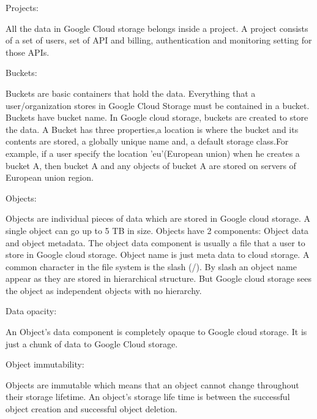 \documentclass[9pt,twocolumn,twoside]{../../styles/osajnl}
\begin{document}
\begin{flushleft}

Projects: 

All the data in Google Cloud storage belongs inside a project. A project consists of	 a set of users, set of API and billing, authentication and monitoring setting for those APIs.\cite{www-google-cloud-storage} 
\end{flushleft}


\begin{flushleft}
Buckets:

Buckets are basic containers that hold the data. Everything that a user/organization stores in Google Cloud Storage must be contained in a bucket. Buckets have bucket name. In Google cloud storage, buckets are created to store the data. A Bucket has three properties,a location is where the bucket and its contents are stored, a globally unique name and, a default storage class.For example, if a user specify the location 'eu'(European union)  when he creates a bucket A, then bucket A and any objects of bucket A are stored on servers of European union region. 

\end{flushleft}


\begin{flushleft}

Objects:

Objects are individual pieces of data which are stored in Google cloud storage. A single object can go up to 5 TB in size. Objects have 2 components: Object data and object metadata. The object data component is usually a file that a user to store in Google cloud storage.
Object name is just meta data to cloud storage. A common character in the file system is the slash (/). By slash an object name appear as they are stored in hierarchical structure. But Google cloud storage sees the object as independent objects with no hierarchy.
\end{flushleft}


\begin{flushleft}

Data opacity: 

An Object’s data component is completely opaque to Google cloud storage. It is just a chunk of data to Google Cloud storage.

\end{flushleft}


\begin{flushleft}
Object immutability: 

Objects are immutable which means that an object cannot change throughout their storage lifetime. An object's storage life time is between the successful object creation and successful object deletion. 
\end{flushleft}
\end{document}
